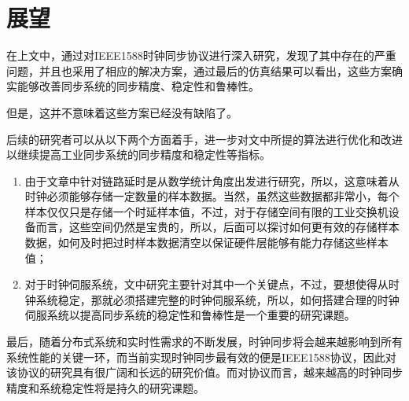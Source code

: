 \section{展望}
在上文中，通过对IEEE1588时钟同步协议进行深入研究，发现了其中存在的严重问题，并且也采用了相应的解决方案，通过最后的仿真结果可以看出，这些方案确实能够改善同步系统的同步精度、稳定性和鲁棒性。

但是，这并不意味着这些方案已经没有缺陷了。

后续的研究者可以从以下两个方面着手，进一步对文中所提的算法进行优化和改进以继续提高工业同步系统的同步精度和稳定性等指标。
\begin{enumerate}[noitemsep,topsep=0pt,parsep=0pt,partopsep=0pt]
	\item 由于文章中针对链路延时是从数学统计角度出发进行研究，所以，这意味着从时钟必须能够存储一定数量的样本数据。当然，虽然这些数据都非常小，每个样本仅仅只是存储一个时延样本值，不过，对于存储空间有限的工业交换机设备而言，这些空间仍然是宝贵的，所以，后面可以探讨如何更有效的存储样本数据，如何及时把过时样本数据清空以保证硬件层能够有能力存储这些样本值；
	\item 对于时钟伺服系统，文中研究主要针对其中一个关键点，不过，要想使得从时钟系统稳定，那就必须搭建完整的时钟伺服系统，所以，如何搭建合理的时钟伺服系统以提高同步系统的稳定性和鲁棒性是一个重要的研究课题。
\end{enumerate}

最后，随着分布式系统和实时性需求的不断发展，时钟同步将会越来越影响到所有系统性能的关键一环，而当前实现时钟同步最有效的便是IEEE1588协议，因此对该协议的研究具有很广阔和长远的研究价值。而对协议而言，越来越高的时钟同步精度和系统稳定性将是持久的研究课题。